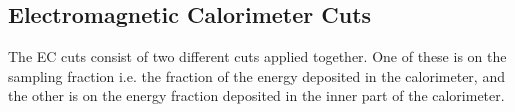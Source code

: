 \subsection{Electromagnetic Calorimeter Cuts}    %
\label{ecCuts}

The EC cuts consist of two %
different cuts applied together. One of these is on the sampling fraction i.e. the fraction of the energy deposited in the calorimeter, and the other is on the energy fraction deposited in the inner part of the calorimeter. %

